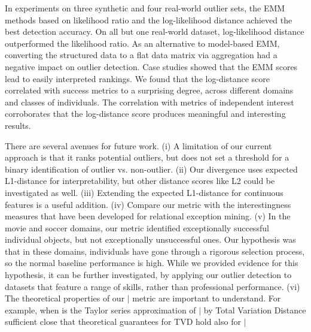 {In experiments on three synthetic and four real-world outlier sets, the EMM methods based on likelihood ratio and the log-likelihood distance achieved the best detection accuracy. On all but one real-world dataset, log-likelihood distance outperformed the likelihood ratio. As an alternative to model-based EMM, converting the structured data to a flat data matrix via aggregation had a negative impact on outlier detection. 
Case studies showed that the EMM scores lead to easily interpreted rankings. We found that the log-distance score correlated with success metrics to a surprising degree, across different domains and classes of individuals. The correlation with metrics of independent interest corroborates that the log-distance score produces meaningful and interesting results.
%

 							
There are several avenues for future work.  (i) A limitation of our current approach is that it ranks potential outliers, but does not set a threshold for a binary identification of outlier vs. non-outlier. (ii) Our divergence uses expected L1-distance for interpretability, but other distance scores like L2 could be investigated as well. (iii) Extending the expected L1-distance for continuous features is a useful addition. (iv) Compare our metric with the interestingness measures that have been developed for relational exception mining. (v) In the movie and soccer domains, our metric identified exceptionally successful individual objects, but not exceptionally unsuccessful ones. Our hypothesis was that in these domains, individuals have gone through a rigorous selection process, so the normal baseline performance is high. While we provided evidence for this hypothesis, it can be further investigated,  by applying our outlier detection to datasets that feature a range of skills, rather than professional performance. (vi) The theoretical properties of our $\mid$ metric are important to understand. For example, when is the Taylor series approximation of $\mid$ by Total Variation Distance sufficient close that theoretical guarantees for TVD hold also for $\mid$
								
}
